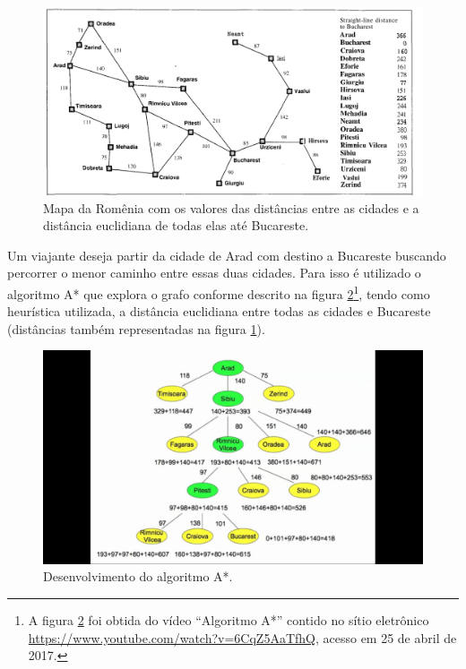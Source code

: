 \begin{figure}[H]
\centering
\includegraphics[width=.90\textwidth]{figuras/Aestrela-mapa1} 
\caption{Mapa da Romênia com os valores das distâncias entre as cidades e a distância euclidiana de todas elas até Bucareste.}
\label{fig-aestrela-algoritmo-mapa1}
\end{figure}
\newpage
Um viajante deseja partir da cidade de Arad com destino a Bucareste buscando percorrer o menor caminho entre essas duas cidades. Para isso é utilizado o algoritmo A* que explora o grafo conforme descrito na figura \ref{fig-aestrela-algoritmo-mapa2}\footnote{A figura \ref{fig-aestrela-algoritmo-mapa2} foi obtida do vídeo ``Algoritmo A*'' contido no sítio eletrônico \url{https://www.youtube.com/watch?v=6CqZ5AaTfhQ}, acesso em 25 de abril de 2017.}, tendo como heurística utilizada, a distância euclidiana entre todas as cidades e Bucareste (distâncias também representadas na figura \ref{fig-aestrela-algoritmo-mapa1}).

\begin{figure}[H]
\centering
\includegraphics[width=.85\textwidth]{figuras/Aestrela-mapa2} 
\caption{Desenvolvimento do algoritmo A*.}
\label{fig-aestrela-algoritmo-mapa2}
\end{figure}

